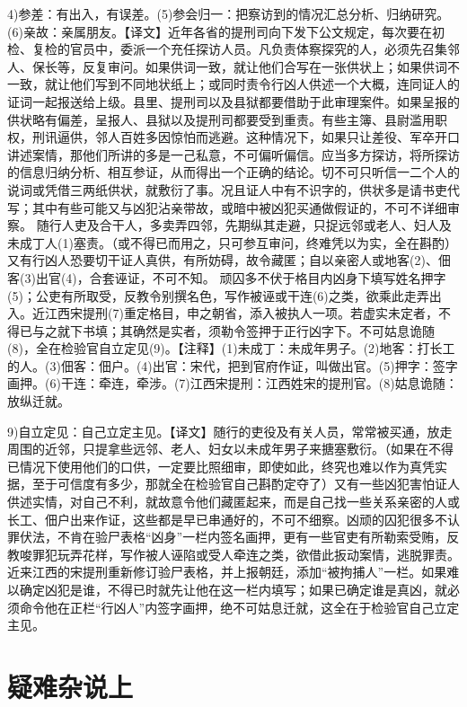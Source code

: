 \documentclass[12pt,UTF8]{ctexbook}
\begin{document}
4)参差：有出入，有误差。(5)参会归一：把察访到的情况汇总分析、归纳研究。(6)亲故：亲属朋友。【译文】近年各省的提刑司向下发下公文规定，每次要在初检、复检的官员中，委派一个充任探访人员。凡负责体察探究的人，必须先召集邻人、保长等，反复审问。如果供词一致，就让他们合写在一张供状上；如果供词不一致，就让他们写到不同地状纸上；或同时责令行凶人供述一个大概，连同证人的证词一起报送给上级。县里、提刑司以及县狱都要借助于此审理案件。如果呈报的供状略有偏差，呈报人、县狱以及提刑司都要受到重责。有些主簿、县尉滥用职权，刑讯逼供，邻人百姓多因惊怕而逃避。这种情况下，如果只让差役、军卒开口讲述案情，那他们所讲的多是一己私意，不可偏听偏信。应当多方探访，将所探访的信息归纳分析、相互参证，从而得出一个正确的结论。切不可只听信一二个人的说词或凭借三两纸供状，就敷衍了事。况且证人中有不识字的，供状多是请书吏代写；其中有些可能又与凶犯沾亲带故，或暗中被凶犯买通做假证的，不可不详细审察。
随行人吏及合干人，多卖弄四邻，先期纵其走避，只捉远邻或老人、妇人及未成丁人(1)塞责。（或不得已而用之，只可参互审问，终难凭以为实，全在斟酌）又有行凶人恐要切干证人真供，有所妨碍，故令藏匿；自以亲密人或地客(2)、佃客(3)出官(4)，合套诬证，不可不知。
顽囚多不伏于格目内凶身下填写姓名押字(5)；公吏有所取受，反教令别撰名色，写作被诬或干连(6)之类，欲乘此走弄出入。近江西宋提刑(7)重定格目，申之朝省，添入被执人一项。若虚实未定者，不得已与之就下书填；其确然是实者，须勒令签押于正行凶字下。不可姑息诡随(8)，全在检验官自立定见(9)。【注释】(1)未成丁：未成年男子。(2)地客：打长工的人。(3)佃客：佃户。(4)出官：宋代，把到官府作证，叫做出官。(5)押字：签字画押。(6)干连：牵连，牵涉。(7)江西宋提刑：江西姓宋的提刑官。(8)姑息诡随：放纵迁就。

9)自立定见：自己立定主见。【译文】随行的吏役及有关人员，常常被买通，放走周围的近邻，只提拿些远邻、老人、妇女以未成年男子来搪塞敷衍。（如果在不得已情况下使用他们的口供，一定要比照细审，即使如此，终究也难以作为真凭实据，至于可信度有多少，那就全在检验官自己斟酌定夺了）又有一些凶犯害怕证人供述实情，对自己不利，就故意令他们藏匿起来，而是自己找一些关系亲密的人或长工、佃户出来作证，这些都是早已串通好的，不可不细察。凶顽的囚犯很多不认罪伏法，不肯在验尸表格“凶身”一栏内签名画押，更有一些官吏有所勒索受贿，反教唆罪犯玩弄花样，写作被人诬陷或受人牵连之类，欲借此扳动案情，逃脱罪责。近来江西的宋提刑重新修订验尸表格，并上报朝廷，添加“被拘捕人”一栏。如果难以确定凶犯是谁，不得已时就先让他在这一栏内填写；如果已确定谁是真凶，就必须命令他在正栏“行凶人”内签字画押，绝不可姑息迁就，这全在于检验官自己立定主见。

\chapter{疑难杂说上}
\end{document}
